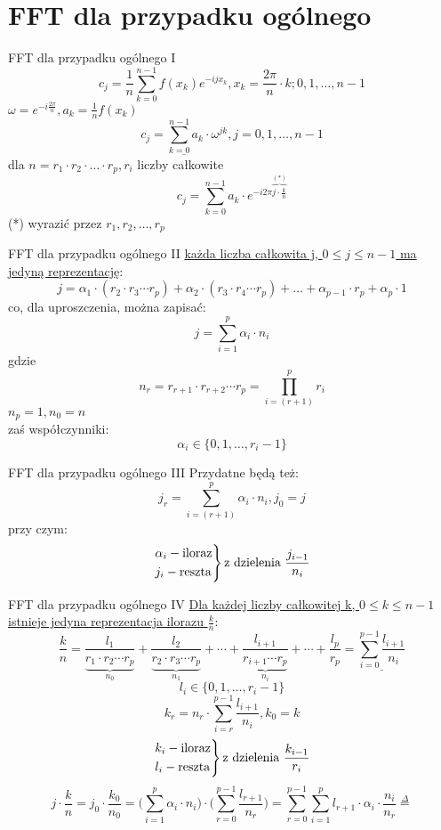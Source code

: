 \section{FFT dla przypadku ogólnego}
\begin{frame}{FFT dla przypadku ogólnego I}
	\[
		c_j = \frac{1}{n} \sum\limits_{k = 0}^{n-1} f(x_k)e^{-ijx_k}, x_k = \frac{2\pi}{n} \cdot k; 0, 1, \dots, n-1
	\]
	$\omega = e^{-i\frac{2\pi}{n}}, a_k = \frac{1}{n} f(x_k)$
	\[
		\underline{c_j = \sum\limits_{k = 0}^{n-1} a_k \cdot \omega^{jk}}, j = 0, 1, \dots, n-1
	\]
	dla $n = r_1 \cdot r_2 \cdot \dots \cdot r_p, r_i$ liczby całkowite
	\[
		c_j = \sum\limits_{k = 0}^{n-1} a_k \cdot e^{-i2\pi \overbrace{j \cdot \frac{k}{n}}^{(*)}}
		\tag{16.29}
	\]
	(*) wyrazić przez $r_1, r_2, \dots, r_p$
\end{frame}
\begin{frame}{FFT dla przypadku ogólnego II}
	\underline{każda liczba całkowita j, $0 \leq j \leq n-1$ ma jedyną reprezentację}:
	\[
		j = \alpha_1 \cdot (r_2 \cdot r_3 \cdots r_p) + \alpha_2 \cdot (r_3 \cdot r_4 \cdots r_p) + \dots + \alpha_{p-1} \cdot r_p + \alpha_p \cdot 1
	\]
	co, dla uproszczenia, można zapisać:
	\[
		j = \sum\limits_{i = 1}^{p} \alpha_i \cdot n_i
	\]
	gdzie
	\[
		n_r = r_{r+1} \cdot r_{r+2} \cdots r_p = \prod\limits_{i = (r+1)}^{p} r_i
	\]
	$n_p = 1, n_0 = n$ \\
	zaś współczynniki:
	\[
		\alpha_i \in \{0, 1, \dots, r_i - 1\}
	\]
\end{frame}
\begin{frame}{FFT dla przypadku ogólnego III}
	Przydatne będą też:
	\[
		j_r = \sum\limits_{i = (r+1)}^{p} \alpha_i \cdot n_i, j_0 = j
	\]
	przy czym:
	\[
		\begin{rcases}
			\alpha_i - \text{iloraz} \\
			j_i - \text{reszta}
		\end{rcases}
		\text{z dzielenia } \frac{j_{i-1}}{n_i}
	\]
\end{frame}
\begin{frame}{FFT dla przypadku ogólnego IV}
	\underline{Dla każdej liczby całkowitej k, $0 \leq k \leq n-1$} \\
	\underline{istnieje jedyna reprezentacja ilorazu $\frac{k}{n}$}:
	\[
		\frac{k}{n} = \frac{l_1}{\underbrace{r_1 \cdot r_2 \cdots r_p}_{n_0}} + \frac{l_2}{\underbrace{r_2 \cdot r_3 \cdots r_p}_{n_1}} + \cdots + \frac{l_{i+1}}{\underbrace{r_{i+1} \cdots r_p}_{n_i}} + \cdots + \frac{l_p}{r_p} = \underline{\sum\limits_{i = 0}^{p-1} \frac{l_{i+1}}{n_i}}
	\]
	\[
		l_i \in \{0, 1, \dots, r_i - 1\}
	\]
	\[
		k_r = n_r \cdot \sum\limits_{i = r}^{p-1} \frac{l_{i+1}}{n_i}, k_0 = k
	\]
	\[
		\begin{rcases}
			k_i - \text{iloraz} \\
			l_i - \text{reszta}
		\end{rcases}
		\text{z dzielenia } \frac{k_{i-1}}{r_i}
	\]
	\[
		j \cdot \frac{k}{n} = j_0 \cdot \frac{k_0}{n_0} = \Bigg( \sum\limits_{i = 1}^{p} \alpha_i \cdot n_i \Bigg) \cdot \Bigg( \sum\limits_{r = 0}^{p-1} \frac{l_{r+1}}{n_r} \Bigg) = \sum\limits_{r = 0}^{p-1} \sum\limits_{i = 1}^{p} l_{r+1} \cdot \alpha_i \cdot \frac{n_i}{n_r} \stackrel{\Delta}{=}	
	\]
\end{frame}

